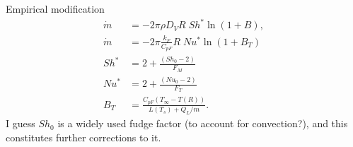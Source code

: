 \documentclass[11pt,twoside]{report}
\begin{document}
Empirical modification \cite{Abramzon1988}
\begin{align}
  \dot{m} &= - 2\pi \rho D_V R \; Sh^* \ln{(1 + B)}, \\
  \dot{m} &= - 2\pi \frac{k_F}{C_{pF}} R \; Nu^* \ln{(1 + B_T)} \\
  Sh^* &= 2 + \frac{(Sh_0 - 2)}{F_M} \\
  Nu^* &= 2 + \frac{(Nu_0 - 2)}{F_T} \\
  B_T &= \frac{C_{pF} (T_\infty - T(R))}{L(T_s) + Q_L / \dot{m}}.
\end{align}
I guess $Sh_0$ is a widely used fudge factor (to account for convection?), and this constitutes further corrections to it.



\end{document}
